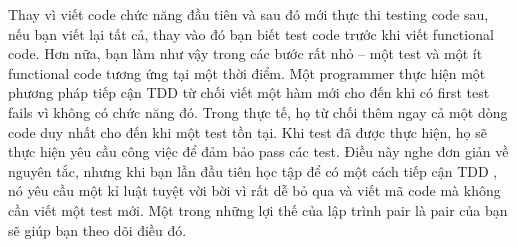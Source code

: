 \documentclass[a4paper]{article}
\begin{document}
Thay vì viết code chức năng đầu tiên và sau đó mới thực thi testing code sau, nếu bạn viết lại tất cả, thay vào đó bạn biết test code trước khi viết functional code. Hơn nữa, bạn làm như vậy trong các bước rất nhỏ – một test và một ít functional code tương ứng tại một thời điểm. Một programmer thực hiện một phương pháp tiếp cận TDD từ chối viết một hàm mới cho đến khi có first test fails vì không có chức năng đó. Trong thực tế, họ từ chối thêm ngay cả một dòng code duy nhất cho đến khi một test tồn tại. Khi test đã được thực hiện, họ sẽ thực hiện yêu cầu công việc để đảm bảo pass các test. Điều này nghe đơn giản về nguyên tắc, nhưng khi bạn lần đầu tiên học tập để có một cách tiếp cận TDD , nó yêu cầu một kỉ luật tuyệt vời bời vì rất dễ bỏ qua và viết mã code mà không cần viết một test mới. Một trong những lợi thế của lập trình pair là pair của bạn sẽ giúp bạn theo dõi điều đó.
\end{document}

